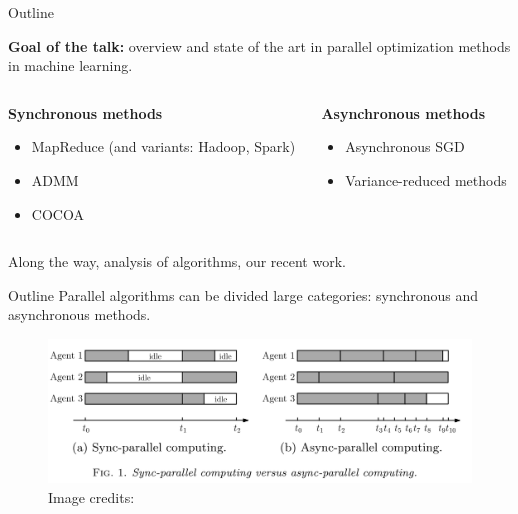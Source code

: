 \documentclass[10pt, notes]{beamer}
\begin{document}
\begin{frame}{Outline}

{\bfseries Goal of the talk:} overview and state of the art in parallel optimization methods in machine learning.

\medskip

\begin{columns}[T] %
\begin{column}{.5\textwidth}
{\centering \bfseries Synchronous methods}
\begin{itemize}
\item MapReduce (and variants: Hadoop, Spark)
\item ADMM
\item COCOA
\end{itemize}
\end{column}%
\hfill%
\begin{column}{.5\textwidth}
{\centering \bfseries Asynchronous methods}
\begin{itemize}
\item Asynchronous SGD
\item Variance-reduced methods
\end{itemize}
\end{column}%
\end{columns}
\vspace{1em}

Along the way, analysis of algorithms, our recent work.

\end{frame}

\begin{frame}{Outline}
Parallel algorithms can be divided  large categories: 
synchronous and asynchronous methods.

\begin{figure}
\includegraphics[width=\linewidth]{img/sync_vs_async}
{\small Image credits: \parencite{peng2016arock}}
\end{figure}
\end{frame}
\end{document}
